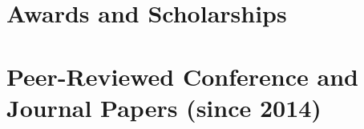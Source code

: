 \documentclass{chencv}
\affiliation{University of California, Los Angeles}
\begin{document}
\makecvtitle

%
\vspace{-0.25em}
%

\section{Awards and Scholarships}


%

\section{Peer-Reviewed Conference and Journal Papers (since 2014)}


%
%
%
%
%
%
%
%
%
%
%
%
\end{document}

